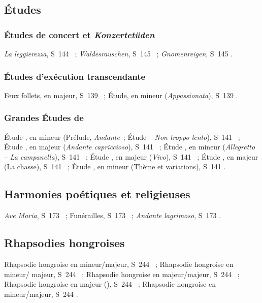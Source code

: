 \subsection{Études}

\subsubsection{Études de concert et \emph{Konzertetüden}}

\emph{La leggierezza}, S~144 ~; \emph{Waldesrauschen}, S~145
~; \emph{Gnomenreigen}, S~145 .

\subsubsection{Études d'exécution transcendante}

Feux follets, en \kB \Flat majeur, S~139 ~; Étude, en \kF mineur
(\emph{Appassionata}), S~139 .

\subsubsection{Grandes Études de \Paganini{}}

Étude , en \kG mineur (Prélude, \emph{Andante}~; Étude --
\emph{Non troppo lento}), S~141 ~; Étude , en \kE \Flat
majeur (\emph{Andante capriccioso}), S~141 ~; Étude , en
\kG \Sharp mineur (\emph{Allegretto} -- \emph{La campanella}), S~141
~; Étude , en \kE majeur (\emph{Vivo}), S~141
~; Étude , en \kE majeur (La chasse), S~141 ~;
Étude , en \kA mineur (Thème et variations), S~141 .

\subsection{Harmonies poétiques et religieuses}

\emph{Ave Maria}, S~173 ~; Funérailles, S~173 ~;
\emph{Andante lagrimoso}, S~173 .

\subsection{Rhapsodies hongroises}

Rhapsodie hongroise  en \kC \Sharp mineur/\kF \Sharp majeur, S~244
~; Rhapsodie hongroise  en \kB \Flat mineur/\kB \Flat
majeur, S~244 ~; Rhapsodie hongroise  en \kD \Flat
majeur/\kB \Flat majeur, S~244 ~; Rhapsodie hongroise 
en \kE \Flat majeur (), S~244 ~; Rhapsodie
hongroise  en \kC \Sharp mineur/\kD \Flat majeur, S~244
.

